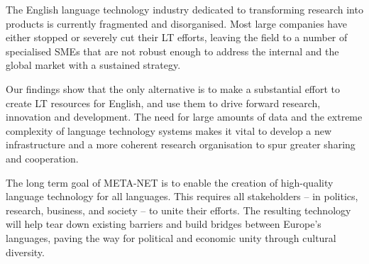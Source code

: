 \documentclass[]{../../metanetpaper}
\begin{document}
\begin{multicols}{2}
The English language technology industry dedicated to transforming research into products is currently fragmented and disorganised. Most large companies have either stopped or severely cut their LT efforts, leaving the field to a number of specialised SMEs that are not robust enough to address the internal and the global market with a sustained strategy. 

Our findings show that the only alternative is to make a substantial effort to create LT resources for English, and use them to drive forward research, innovation and development. The need for large amounts of data and the extreme complexity of language technology systems makes it vital to develop a new infrastructure and a more coherent research organisation to spur greater sharing and cooperation.

The long term goal of META-NET is to enable the creation of high-quality language technology for all languages. This requires all stakeholders -- in politics, research, business, and society -- to unite their efforts. The resulting technology will help tear down existing barriers and build bridges between Europe’s languages, paving the way for political and economic unity through cultural diversity. 
\end{multicols}

\clearpage
\end{document}
